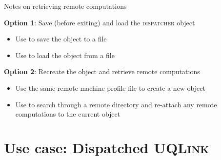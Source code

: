 \documentclass[]{rsuqbeamernew}
\begin{document}
\begin{frame}[fragile]{Notes on retrieving remote computations}

\begin{block}{\textbf{Option 1}: Save (before exiting) and load the \textsc{dispatcher} object}
  \begin{itemize}
    \item Use  to save the object to a file
    \item Use  to load the object from a file
  \end{itemize}
\end{block}

\begin{block}{\textbf{Option 2}: Recreate the object and retrieve remote computations}
  \begin{itemize}
    \item Use the same remote machine profile file to create a new object
    \item Use  to search through a remote directory
          and re-attach any remote computations to the current object
  \end{itemize}
\end{block}


\end{frame}


\section{Use case: Dispatched \textsc{UQLink}}
\end{document}
